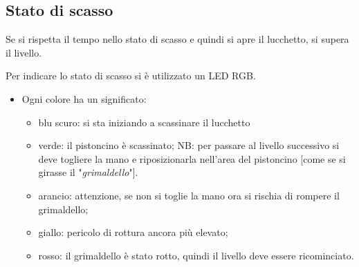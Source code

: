 \clearpage
\subsection{Stato di scasso}\label{sec:statodiscasso}
Se si rispetta il tempo nello stato di scasso e quindi si apre il lucchetto, si supera il livello.

Per indicare lo stato di scasso si è utilizzato un LED RGB. 
\begin{itemize}
	\item Ogni colore ha un significato:
	\begin{itemize}
		\item blu scuro: si sta iniziando a scassinare il lucchetto
		\item verde: il pistoncino è scassinato;
			\subitem NB: per passare al livello successivo si deve togliere la mano e riposizionarla nell'area del pistoncino [come se si girasse il "\textit{grimaldello}"].
		\item arancio: attenzione, se non si toglie la mano ora si rischia di rompere il grimaldello;
		\item giallo: pericolo di rottura ancora più elevato;
		\item rosso: il grimaldello è stato rotto, quindi il livello deve essere ricominciato.
	\end{itemize}	
\end{itemize}
